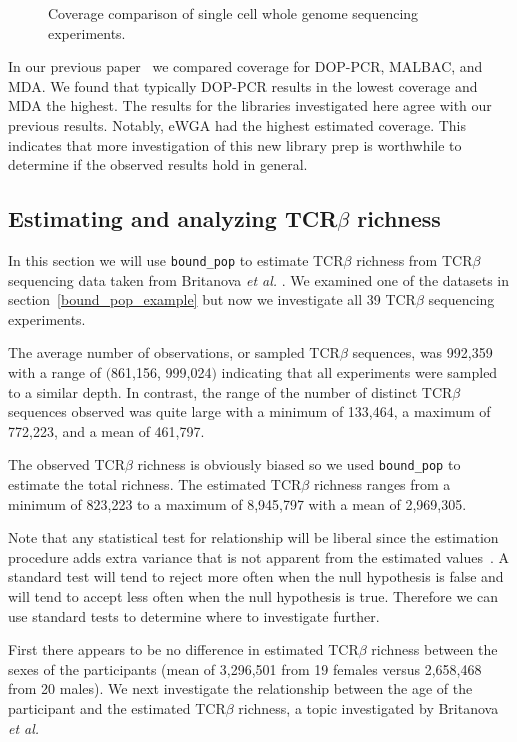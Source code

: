 \documentclass[11pt, titlepage]{article}
\newcommand{\fn}[1]{\texttt{#1}}
\begin{document}
\begin{figure}[h!]
\caption{Coverage comparison of single cell
whole genome sequencing experiments.}
\end{figure}

In our previous paper~\cite{daley2014modeling} we compared coverage
for DOP-PCR, MALBAC, and MDA.  We found that typically DOP-PCR results
in the lowest coverage and MDA the highest.  The results for the
libraries investigated here agree with our previous results.  Notably,
eWGA had the highest estimated coverage.  This indicates that more
investigation of this new library prep is worthwhile to determine if
the observed results hold in general.

\newpage

\subsection*{Estimating and analyzing TCR$\beta$ richness}

In this section we will use \fn{bound\_pop}
to estimate TCR$\beta$ richness from TCR$\beta$
sequencing data taken from Britanova {\em et al.}
\cite{britanova2014age}.  We examined one
of the datasets in section~\ref{bound_pop_example}
but now we investigate all 39 TCR$\beta$ sequencing
experiments.

The average number of observations, or sampled
TCR$\beta$ sequences, was 992,359 with a
range of  $($861,156, 999,024$)$
indicating that all experiments were sampled to a similar
depth.
In contrast, the range of the number of distinct TCR$\beta$
sequences observed was quite large with a minimum of
133,464, a maximum of 772,223, and a mean of 461,797.

The observed TCR$\beta$ richness is obviously biased so
we used \fn{bound\_pop} to estimate the total richness.
The estimated TCR$\beta$ richness ranges from a minimum
of 823,223 to a maximum of 8,945,797 with a mean
of 2,969,305.

Note that any statistical test for relationship will be liberal
since the estimation procedure adds extra variance that is not
apparent from the estimated values~\cite{willis2015inference}.
A standard test will tend to reject more often when the
null hypothesis is false and will tend to accept less often
when the null hypothesis is true.
Therefore we can use standard tests to determine
where to investigate further.

First there appears to be no difference in
estimated TCR$\beta$ richness between the sexes
of the participants (mean of 3,296,501 from 19 females
versus 2,658,468 from 20 males).
We next investigate the relationship between the age
of the participant and the estimated TCR$\beta$ richness,
a topic investigated by Britanova {\em et al.}
\end{document}
